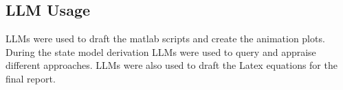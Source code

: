 \subsection{LLM Usage}
\label{subsec:llm usage}

LLMs were used to draft the matlab scripts and create the animation plots. During the state model derivation LLMs were used to query and appraise different approaches. LLMs were also used to draft the Latex equations for the final report.